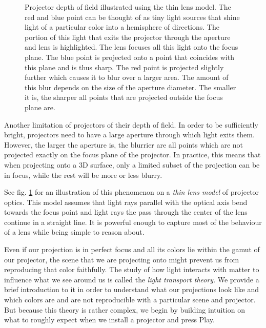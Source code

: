 \begin{figure}[ht]
    \centering
    \def\svgwidth{0.8\textwidth}
    
    \caption{Projector depth of field illustrated using the thin lens model. The red and blue point can be thought of as tiny light sources that shine light of a particular color into a hemisphere of directions. The portion of this light that exits the projector through the aperture and lens is highlighted. The lens focuses all this light onto the focus plane. The blue point is projected onto a point that coincides with this plane and is thus sharp. The red point is projected slightly further which causes it to blur over a larger area. The amount of this blur depends on the size of the aperture diameter. The smaller it is, the sharper all points that are projected outside the focus plane are.}
    \label{fig:background_thin_lens}
\end{figure}

Another limitation of projectors of their depth of field. In order to be sufficiently bright, projectors need to have a large aperture through which light exits them. However, the larger the aperture is, the blurrier are all points which are not projected exactly on the focus plane of the projector. In practice, this means that when projecting onto a 3D surface, only a limited subset of the projection can be in focus, while the rest will be more or less blurry.

See fig. \ref{fig:background_thin_lens} for an illustration of this phenomenon on a \textit{thin lens model} of projector optics. This model assumes that light rays parallel with the optical axis bend towards the focus point and light rays the pass through the center of the lens continue in a straight line. It is powerful enough to capture most of the behaviour of a lens while being simple to reason about.

Even if our projection is in perfect focus and all its colors lie within the gamut of our projector, the scene that we are projecting onto might prevent us from reproducing that color faithfully. The study of how light interacts with matter to influence what we see around us is called the \textit{light transport theory}. We provide a brief introduction to it in order to understand what our projections look like and which colors are and are not reproducible with a particular scene and projector. But because this theory is rather complex, we begin by building intuition on what to roughly expect when we install a projector and press Play.

